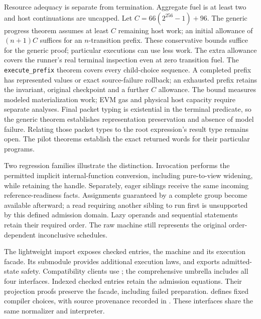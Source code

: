 \documentclass[conference]{IEEEtran}
\newcommand{\code}[1]{\texttt{#1}}
\begin{document}
Resource adequacy is separate from termination. Aggregate fuel is at least two
and host continuations are uncapped. Let $C=66(2^{256}-1)+96$.
The generic progress theorem assumes at least $C$ remaining host work;
an initial allowance of $(n+1)C$ suffices for an $n$-transition prefix.
These conservative bounds suffice for the generic proof; particular executions
can use less work. The extra allowance covers
the runner's real terminal inspection even at zero transition fuel. The
\code{execute\_prefix} theorem covers every child-choice sequence. A completed
prefix has represented values or exact source-failure rollback; an exhausted
prefix retains the invariant, original checkpoint and a further $C$ allowance.
The bound measures modeled materialization work; EVM gas and physical host
capacity require separate analyses. Final packet typing is existential in the
terminal predicate, so the generic theorem establishes representation
preservation and absence of model failure. Relating those packet types to the
root expression's result type remains open. The pilot theorems establish the
exact returned words for their particular programs.

Two regression families illustrate the distinction. Invocation performs
the permitted implicit internal-function conversion, including pure-to-view
widening, while retaining the handle. Separately, eager siblings receive the
same incoming reference-readiness facts. Assignments guaranteed by a complete
group become available afterward; a read requiring another sibling to run
first is unsupported by this defined admission domain. Lazy operands and
sequential statements retain their required order. The raw machine still
represents the original order-dependent inconclusive schedules.

The lightweight import  exposes checked entries,
the machine and its execution facade. Its  submodule provides
additional execution laws, and  exports admitted-state safety.
Compatibility clients use
; the comprehensive 
umbrella includes all four interfaces. Indexed checked entries retain
the admission equations. Their projection proofs preserve the facade,
including failed preparation.  defines fixed compiler choices,
with source provenance recorded in . These
interfaces share the same normalizer and interpreter.
\end{document}

